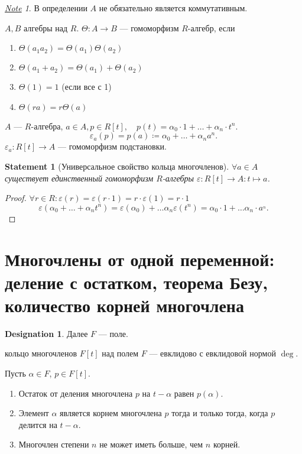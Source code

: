 \documentclass[11pt]{book}
\theoremstyle{definition}
\theoremstyle{plain}
\theoremstyle{plain}
\newtheorem{st}{Statement}
\theoremstyle{definition}
\newtheorem*{name}{Designation}
\theoremstyle{remark}
\newtheorem*{note}{\underline{Note}}
\begin{document}
 \begin{note}
     В определении $ A$ не обязательно является коммутативным.
 \end{note}
 \begin{defn}
     $ A, B$ алгебры над $ R$.
     $\Theta : A \to  B$
      --- гомоморфизм $ R$-алгебр, если 
      \begin{enumerate}[noitemsep]
	 \item $ \Theta(a_1a_2) =\Theta (a_1) \Theta(a_2) $
	 \item $ \Theta(a_1+a_2) = \Theta(a_1) + \Theta(a_2)$
	 \item $ \Theta (1) = 1 $ (если все с 1)
	 \item  $ \Theta(ra) = r \Theta(a)$
     \end{enumerate}
 \end{defn}
 \begin{defn}
     $ A$ --- $ R$-алгебра, $ a \in  A, p \in  R[t], \quad p(t) = \alpha _0 \cdot  1 + \ldots + \alpha _n \cdot  t ^{n}$.
 \[
     \varepsilon _a(p) = p(a) \coloneqq \alpha _0 + \ldots + \alpha _n a^{n}
 .\] 
 $ \varepsilon _a: R[t] \to  A$ --- гомоморфизм подстановки.
 \end{defn}
 \begin{st}[Универсальное свойство кольца многочленов]
     $
     \forall  a \in  A  
     $ существует единственный гомоморфизм $ R $-алгебры  $ \varepsilon : R[t] \to A: t \mapsto a$.
 \end{st}
 \begin{proof}
     $ \forall  r \in  R: \varepsilon (r) = \varepsilon (r \cdot 1) = r \cdot  \varepsilon (1) = r \cdot  1$
     \[
	 \varepsilon ( \alpha _0 + \ldots  + \alpha _n t ^{n}) = \varepsilon ( \alpha _0) + \ldots  \alpha _n \varepsilon ( t ^{n}) =  \alpha _0 \cdot  1 + \ldots \alpha _n \cdot  a^{_n}
     .\] 
 \end{proof}
 \section{Многочлены от одной переменной: деление с остатком, теорема Безу, количество корней многочлена}
\begin{name}
    Далее $ F$  --- поле.
\end{name}
\begin{thm}
  кольцо многочленов $ F[t]$  над полем $ F $ --- евклидово с евклидовой нормой $ \deg$.
\end{thm}
 \begin{thm}[Безу]
     Пусть $ \alpha \in F$, $ p \in F[t]$.
     \begin{enumerate}[noitemsep]
	 \item 
     Остаток от деления многочлена $ p$ на $ t - \alpha $ равен $ p(\alpha)$.
 \item Элемент $ \alpha $ является корнем многочлена $ p$  тогда и только тогда, когда $ p$ делится на  $ t- \alpha $.
 \item Многочлен степени $ n$ не может иметь больше, чем  $ n$ корней.
     \end{enumerate}
 \end{thm}
\end{document}
